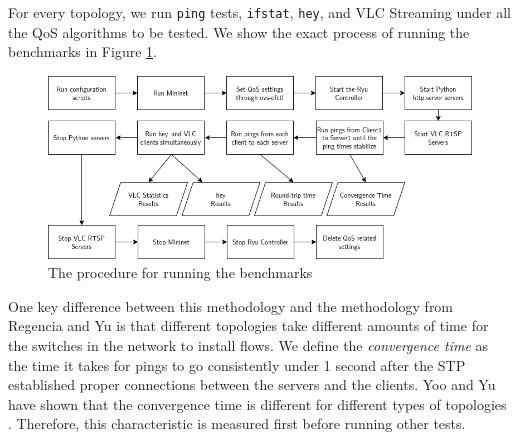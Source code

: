 For every topology, we run \texttt{ping} tests, \texttt{ifstat}, \texttt{hey}, and VLC Streaming under all the QoS algorithms to be tested. We show the exact process of running the benchmarks in Figure \ref{fig:benchmark}.

\begin{figure}
    \centering
    \includegraphics[width=\textwidth]{Figures/Test Procedure.drawio.png}
    \caption{The procedure for running the benchmarks}
    \label{fig:benchmark}
\end{figure}

One key difference between this methodology and the methodology from Regencia and Yu is that different topologies take different amounts of time for the switches in the network to install flows. We define the \textit{convergence time} as the time it takes for pings to go consistently under 1 second after the STP established proper connections between the servers and the clients. Yoo and Yu have shown that the convergence time is different for different types of topologies \cite{yoo_building_2022}. Therefore, this characteristic is measured first before running other tests.
